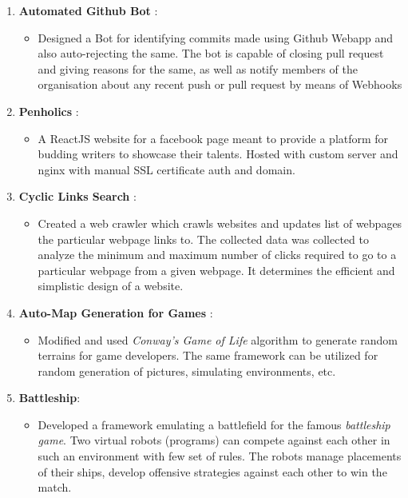 \documentclass[a4paper, oneside, 12pt]{article}
\begin{document}
\begin{enumerate}[label =, itemsep = 2mm, topsep = 0pt, partopsep = 0pt]
  \item
        \textbf{Automated Github Bot }:
        \begin{itemize}[label = - , topsep = 0pt, partopsep = 0pt]
          \item Designed a Bot for identifying commits made using Github Webapp and also auto-rejecting the same. The bot is capable of closing pull request and giving reasons for the same, as well as notify members of the organisation about any recent push or pull request by means of Webhooks
        \end{itemize}
  \item
        \textbf{Penholics }:
        \begin{itemize}[label = - , topsep = 0pt, partopsep = 0pt]
          \item A ReactJS website for a facebook page meant to provide a platform for budding writers to showcase their talents. Hosted with custom server and nginx with manual SSL certificate auth and domain.
        \end{itemize}


  \item
        \textbf{Cyclic Links Search }:
        \begin{itemize}[label = - , topsep = 0pt, partopsep = 0pt]
          \item Created a web crawler which crawls websites and updates list of webpages the particular webpage links to. The collected data was collected to analyze the minimum and maximum number of clicks required to go to a particular webpage from a given webpage. It determines the efficient and simplistic design of a website.
        \end{itemize}

  \item
        \textbf{Auto-Map Generation for Games }:
        \begin{itemize}[label = - , topsep = 0pt, partopsep = 0pt]
          \item Modified and used \textit{Conway's Game of Life} algorithm to generate random terrains for game developers. The same framework can be utilized for random generation of pictures, simulating environments, etc.
        \end{itemize}

  \item
        \textbf{Battleship}:
        \begin{itemize}[label = - , topsep = 0pt, partopsep = 0pt]
          \item Developed a framework emulating a battlefield for the famous \textit{battleship game}. Two virtual robots (programs) can compete against each other in such an environment with few set of rules. The robots manage placements of their ships, develop offensive strategies against each other to win the match.
        \end{itemize}


\end{enumerate}
\end{document}
